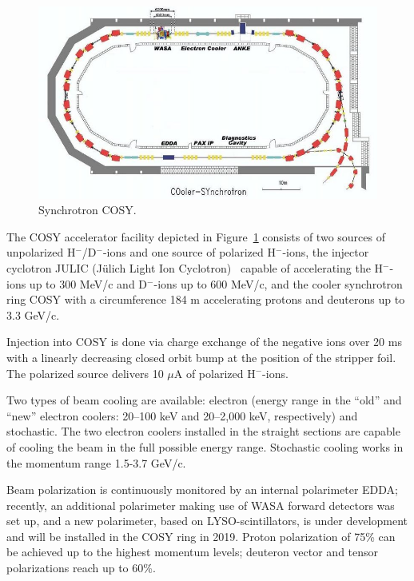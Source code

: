 
\newcommand{\Hm}{H$^-$}
\newcommand{\Dm}{D$^-$}

\begin{figure}[h]
	\centering
	\includegraphics[scale=.5]{images/chapter4/800px-COSY_Ring}
	\caption{Synchrotron COSY.\label{fig:COSY_Ring}}
\end{figure}

The COSY accelerator facility depicted in Figure~\ref{fig:COSY_Ring} consists of two sources of unpolarized \Hm/\Dm-ions and one source of polarized \Hm-ions, the injector cyclotron JULIC (J\"ulich Light Ion Cyclotron)~\cite{JULIC-Injector} capable of accelerating the \Hm-ions up to 300 MeV/c and \Dm-ions up to 600 MeV/c, and the cooler synchrotron ring COSY with a circumference 184 m accelerating protons and deuterons
up to 3.3 GeV/c.~\cite{COSY-Ring}

Injection into COSY is done via charge exchange of the negative ions over 20 ms with a linearly decreasing
closed orbit bump at the position of the stripper foil. The polarized source delivers 10 $\mu$A of polarized \Hm-ions.~\cite{COSY-Ring}

Two types of beam cooling are available: electron (energy range in the ``old'' and ``new'' electron coolers: 20--100 keV and 20--2,000 keV, respectively) and stochastic. 
%
The two electron coolers installed in the straight sections are capable of cooling the beam in the full possible energy range. Stochastic cooling works in the momentum range 1.5-3.7 GeV/c.

Beam polarization is continuously monitored  by an internal polarimeter EDDA; recently, an additional polarimeter making use of WASA forward detectors was set up, and a new polarimeter, based on LYSO-scintillators, is under development and will be installed in the COSY ring in 2019.
Proton polarization of 75\% can be achieved up to the highest momentum levels; deuteron vector and tensor polarizations reach up to 60\%.~\cite[\textbf{Historical background}]{YellowReport}